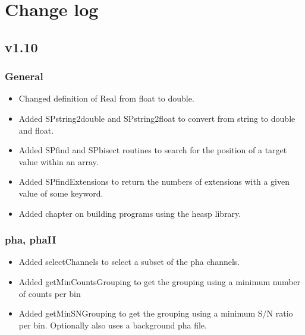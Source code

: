 \documentclass[11pt]{book}
\begin{document}

\chapter{Change log}

\section{v1.10}

\subsection{General}

\begin{itemize}

\item Changed definition of Real from float to double.

\item Added SPstring2double and SPstring2float to convert from
      string to double and float.

\item Added SPfind and SPbisect routines to search for the position
      of a target value within an array.

\item Added SPfindExtensions to return the numbers of extensions with
  a given value of some keyword.

\item Added chapter on building programs using the heasp library.

\end{itemize}

\subsection{pha, phaII}

\begin{itemize}

\item Added selectChannels to select a subset of the pha channels.

\item Added getMinCountsGrouping to get the grouping using a minimum
  number of counts per bin

\item Added getMinSNGrouping to get the grouping using a minimum S/N
  ratio per bin. Optionally also uses a background pha file.

\end{itemize}
\end{document}
